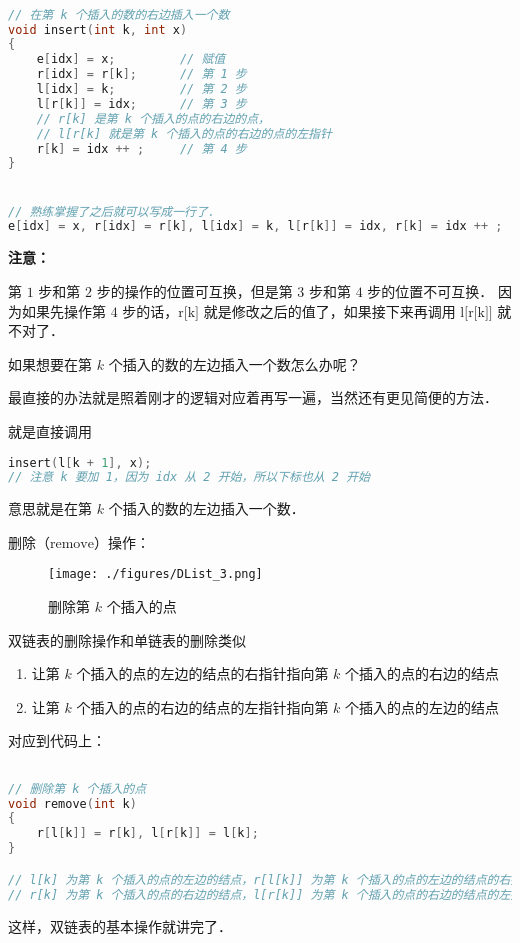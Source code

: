 \begin{lstlisting}[language=cpp]

// 在第 k 个插入的数的右边插入一个数
void insert(int k, int x)
{
    e[idx] = x;         // 赋值
    r[idx] = r[k];      // 第 1 步
    l[idx] = k;         // 第 2 步
    l[r[k]] = idx;      // 第 3 步
    // r[k] 是第 k 个插入的点的右边的点，
    // l[r[k] 就是第 k 个插入的点的右边的点的左指针
    r[k] = idx ++ ;     // 第 4 步
}


// 熟练掌握了之后就可以写成一行了．
e[idx] = x, r[idx] = r[k], l[idx] = k, l[r[k]] = idx, r[k] = idx ++ ;

\end{lstlisting}

\textbf{注意：}

第 $1$ 步和第 $2$ 步的操作的位置可互换，但是第 $3$ 步和第 $4$ 步的位置不可互换．
因为如果先操作第 $4$ 步的话，$\text{r[k]}$ 就是修改之后的值了，如果接下来再调用 $\text{l[r[k]]}$ 就不对了．

如果想要在第 $k$ 个插入的数的左边插入一个数怎么办呢？

最直接的办法就是照着刚才的逻辑对应着再写一遍，当然还有更见简便的方法．

就是直接调用 \begin{lstlisting}[language=cpp]
insert(l[k + 1], x);
// 注意 k 要加 1，因为 idx 从 2 开始，所以下标也从 2 开始
\end{lstlisting}
意思就是在第 $k$ 个插入的数的左边插入一个数．

删除（$\text{remove}$）操作：
\begin{figure}[ht]
\centering
\texttt{[image: ./figures/DList\_3.png]}
\caption{删除第 $k$ 个插入的点} \label{DList_fig3}
\end{figure}

双链表的删除操作和单链表的删除类似

\begin{enumerate}
\item 让第 $k$ 个插入的点的左边的结点的右指针指向第 $k$ 个插入的点的右边的结点
\item 让第 $k$ 个插入的点的右边的结点的左指针指向第 $k$ 个插入的点的左边的结点
\end{enumerate}

对应到代码上：

\begin{lstlisting}[language=cpp]

// 删除第 k 个插入的点
void remove(int k)
{
    r[l[k]] = r[k], l[r[k]] = l[k];
}

// l[k] 为第 k 个插入的点的左边的结点，r[l[k]] 为第 k 个插入的点的左边的结点的右指针
// r[k] 为第 k 个插入的点的右边的结点，l[r[k]] 为第 k 个插入的点的右边的结点的左指针
\end{lstlisting}

这样，双链表的基本操作就讲完了．